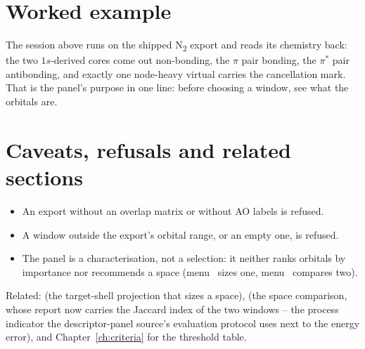 \section{Worked example}

The session above runs on the shipped N\textsubscript{2} export and reads its
chemistry back: the two $1s$-derived cores come out non-bonding, the $\pi$ pair
bonding, the $\pi^*$ pair antibonding, and exactly one node-heavy virtual
carries the cancellation mark.  That is the panel's purpose in one line: before
choosing a window, see what the orbitals are.

\section{Caveats, refusals and related sections}

\begin{refusalbox}
\begin{itemize}
  \item An export without an overlap matrix or without AO labels is refused.
  \item A window outside the export's orbital range, or an empty one, is
    refused.
  \item The panel is a characterisation, not a selection: it neither ranks
    orbitals by importance nor recommends a space (menu~ sizes one,
    menu~ compares two).
\end{itemize}
\end{refusalbox}

Related:  (the target-shell projection that sizes a space),
 (the space comparison, whose report now carries the Jaccard index of
the two windows -- the process indicator the descriptor-panel source's
evaluation protocol uses next to the energy error), and
Chapter~\ref{ch:criteria} for the threshold table.
